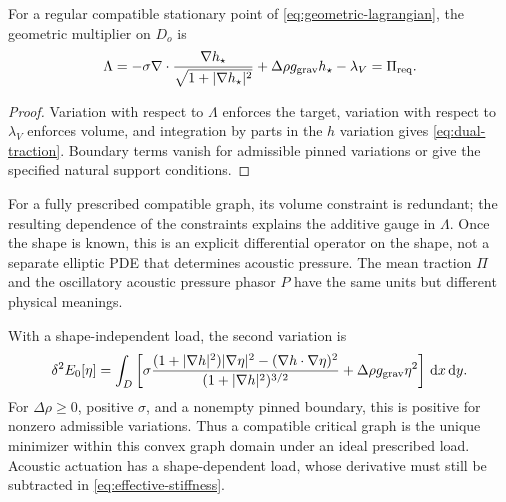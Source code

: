 \begin{proposition}
For a regular compatible stationary point of
\cref{eq:geometric-lagrangian}, the geometric multiplier on $D_o$ is
\begin{equation}
 \Lambda= -\sigma\nabla\cdot\frac{\nabla h_\star}
                  {\sqrt{1+|\nabla h_\star|^2}}
             +\Delta\rho g_{\rm grav}h_\star-\lambda_V
           =\Pi_{\rm req}.
 \label{eq:dual-traction}
\end{equation}
\end{proposition}
\begin{proof}
Variation with respect to $\Lambda$ enforces the target, variation with respect
to $\lambda_V$ enforces volume, and integration by parts in the $h$ variation
gives \cref{eq:dual-traction}. Boundary terms vanish for admissible pinned
variations or give the specified natural support conditions.
\end{proof}
For a fully prescribed compatible graph, its volume constraint is redundant;
the resulting dependence of the constraints explains the additive gauge in
$\Lambda$. Once the shape is known, this is an explicit differential operator
on the shape, not a separate elliptic PDE that determines acoustic pressure.
The mean traction $\Pi$ and the oscillatory acoustic pressure phasor $P$ have
the same units but different physical meanings.

With a shape-independent load, the second variation is
\begin{equation}
 \delta^2 E_0[\eta]=\int_D\left[
 \sigma\frac{(1+|\nabla h|^2)|\nabla\eta|^2
                         -(\nabla h\cdot\nabla\eta)^2}
                       {(1+|\nabla h|^2)^{3/2}}
        +\Delta\rho g_{\rm grav}\eta^2\right]\,\mathrm d x\,\mathrm d y.
 \label{eq:graph-second-variation}
\end{equation}
For $\Delta\rho\geq0$, positive $\sigma$, and a nonempty pinned boundary,
this is positive for nonzero admissible variations. Thus a compatible critical
graph is the unique minimizer within this convex graph domain under an ideal
prescribed load. Acoustic actuation has a shape-dependent load, whose derivative
must still be subtracted in \cref{eq:effective-stiffness}.

